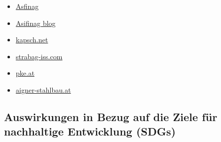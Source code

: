 \documentclass[
]{book}
\providecommand{\tightlist}{%
  \setlength{\itemsep}{0pt}\setlength{\parskip}{0pt}}
\begin{document}
\begin{itemize}
\tightlist
\item
  \href{https://www.asfinag.at/verkehrssicherheit/verkehrsmanagement/verkehrssteuerung/}{Asfinag}
\item
  \href{https://blog.asfinag.at/technik-innovation/c-its-vernetzte-autos-intelligenter-verkehr/}{Asifinag blog}
\item
  \href{https://www.kapsch.net/ktc/Portfolio/IMS/Congestion/Highway-Traffic-Management}{kapsch.net}
\item
  \href{https://www.strabag-iss.com/databases/internet/_public/content30.nsf/web30?Openagent\&id=DE-STRABAGISS-DE_verkehrstechnik.html\&men1=3\&men2=5\&sid=351}{strabag-iss.com}
\item
  \href{https://www.pke.at/index.php?id=17\#c117}{pke.at}
\item
  \href{http://www.aigner-stahlbau.at/leistungen/verkehrstechnik/}{aigner-stahlbau.at}
\end{itemize}

\hypertarget{auswirkungen-in-bezug-auf-die-ziele-fuxfcr-nachhaltige-entwicklung-sdgs-14}{%
\subsection*{Auswirkungen in Bezug auf die Ziele für nachhaltige Entwicklung (SDGs)}\label{auswirkungen-in-bezug-auf-die-ziele-fuxfcr-nachhaltige-entwicklung-sdgs-14}}
\end{document}
